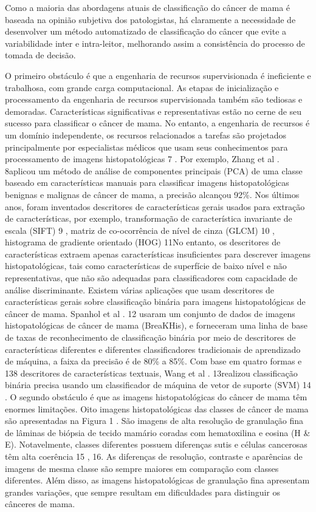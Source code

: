 \documentclass[preprint,12pt,authoryear]{elsarticle}
\begin{document}
 Como a maioria das abordagens atuais de classificação do câncer de mama é baseada na opinião subjetiva dos patologistas, há claramente a necessidade de desenvolver um método automatizado de classificação do câncer que evite a variabilidade inter e intra-leitor, melhorando assim a consistência do processo de tomada de decisão.
 
 
 \cite{HAN2017} O primeiro obstáculo é que a engenharia de recursos supervisionada é ineficiente e trabalhosa, com grande carga computacional. As etapas de inicialização e processamento da engenharia de recursos supervisionada também são tediosas e demoradas. Características significativas e representativas estão no cerne de seu sucesso para classificar o câncer de mama. No entanto, a engenharia de recursos é um domínio independente, os recursos relacionados a tarefas são projetados principalmente por especialistas médicos que usam seus conhecimentos para processamento de imagens histopatológicas 7 . Por exemplo, Zhang et al . 8aplicou um método de análise de componentes principais (PCA) de uma classe baseado em características manuais para classificar imagens histopatológicas benignas e malignas de câncer de mama, a precisão alcançou 92\%. Nos últimos anos, foram inventados descritores de características gerais usados ​​para extração de características, por exemplo, transformação de característica invariante de escala (SIFT) 9 , matriz de co-ocorrência de nível de cinza (GLCM) 10 , histograma de gradiente orientado (HOG) 11No entanto, os descritores de características extraem apenas características insuficientes para descrever imagens histopatológicas, tais como características de superfície de baixo nível e não representativas, que não são adequadas para classificadores com capacidade de análise discriminante. Existem várias aplicações que usam descritores de características gerais sobre classificação binária para imagens histopatológicas de câncer de mama. Spanhol et al . 12 usaram um conjunto de dados de imagens histopatológicas de câncer de mama (BreaKHis), e forneceram uma linha de base de taxas de reconhecimento de classificação binária por meio de descritores de características diferentes e diferentes classificadores tradicionais de aprendizado de máquina, a faixa da precisão é de 80\% a 85\%. Com base em quatro formas e 138 descritores de características textuais, Wang et al . 13realizou classificação binária precisa usando um classificador de máquina de vetor de suporte (SVM) 14 . O segundo obstáculo é que as imagens histopatológicas do câncer de mama têm enormes limitações. Oito imagens histopatológicas das classes de câncer de mama são apresentadas na Figura  1 . São imagens de alta resolução de granulação fina de lâminas de biópsia de tecido mamário coradas com hematoxilina e eosina (H & E). Notavelmente, classes diferentes possuem diferenças sutis e células cancerosas têm alta coerência 15 , 16. As diferenças de resolução, contraste e aparências de imagens de mesma classe são sempre maiores em comparação com classes diferentes. Além disso, as imagens histopatológicas de granulação fina apresentam grandes variações, que sempre resultam em dificuldades para distinguir os cânceres de mama. 
 
\end{document}
